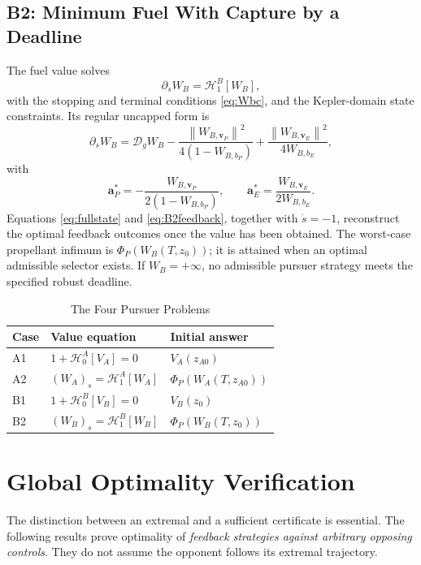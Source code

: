 \documentclass[journal,a4paper]{IEEEtran}
\newcommand{\D}{\mathcal D}
\newcommand{\HH}{\mathcal H}
\newcommand{\norm}[1]{\left\|#1\right\|}
\begin{document}
\subsection{B2: Minimum Fuel With Capture by a Deadline}
The fuel value solves
\begin{equation}
 \boxed{\partial_s W_B=\HH^B_1[W_B],}
 \label{eq:B2}
\end{equation}
with the stopping and terminal conditions \eqref{eq:Wbc}, and the Kepler-domain state constraints. Its regular uncapped form is
\begin{equation}
 \partial_s W_B=\D_g W_B
 -\frac{\norm{W_{B,\mathbf v_P}}^2}{4(1-W_{B,b_P})}
 +\frac{\norm{W_{B,\mathbf v_E}}^2}{4W_{B,b_E}},
 \label{eq:B2expanded}
\end{equation}
with
\begin{equation}
 \boxed{\mathbf a_P^*=-\frac{W_{B,\mathbf v_P}}{2(1-W_{B,b_P})},\qquad
        \mathbf a_E^*= \frac{W_{B,\mathbf v_E}}{2W_{B,b_E}}.}
 \label{eq:B2feedback}
\end{equation}
Equations \eqref{eq:fullstate} and \eqref{eq:B2feedback}, together with $\dot s=-1$, reconstruct the optimal feedback outcomes once the value has been obtained. The worst-case propellant infimum is $\Phi_P(W_B(T,z_0))$; it is attained when an optimal admissible selector exists. If $W_B=+\infty$, no admissible pursuer strategy meets the specified robust deadline.

\begin{table}[t]
\caption{The Four Pursuer Problems}
\label{tab:four}
\centering
\begin{tabular}{@{}lll@{}}
\toprule
Case & Value equation & Initial answer\\
\midrule
A1 & $1+\HH^A_0[V_A]=0$ & $V_A(z_{A0})$\\
A2 & $(W_A)_s=\HH^A_1[W_A]$ & $\Phi_P(W_A(T,z_{A0}))$\\
B1 & $1+\HH^B_0[V_B]=0$ & $V_B(z_0)$\\
B2 & $(W_B)_s=\HH^B_1[W_B]$ & $\Phi_P(W_B(T,z_0))$\\
\bottomrule
\end{tabular}
\end{table}

\section{Global Optimality Verification}
\label{sec:verification}
The distinction between an extremal and a sufficient certificate is essential. The following results prove optimality of \emph{feedback strategies against arbitrary opposing controls}. They do not assume the opponent follows its extremal trajectory.
\end{document}
